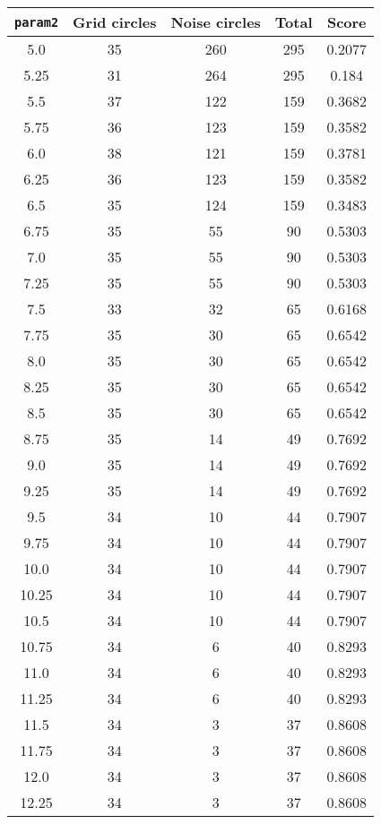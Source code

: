 \documentclass[letterpaper, 12pt]{article}
\begin{document}
\begin{longtable}{|c|c|c|c|c|}
\hline
\textbf{\texttt{param2}} & \textbf{Grid circles} & \textbf{Noise circles} & \textbf{Total} & \textbf{Score} \\
\hline
5.0 & 35 & 260 & 295 & 0.2077 \\
\hline
5.25 & 31 & 264 & 295 & 0.184 \\
\hline
5.5 & 37 & 122 & 159 & 0.3682 \\
\hline
5.75 & 36 & 123 & 159 & 0.3582 \\
\hline
6.0 & 38 & 121 & 159 & 0.3781 \\
\hline
6.25 & 36 & 123 & 159 & 0.3582 \\
\hline
6.5 & 35 & 124 & 159 & 0.3483 \\
\hline
6.75 & 35 & 55 & 90 & 0.5303 \\
\hline
7.0 & 35 & 55 & 90 & 0.5303 \\
\hline
7.25 & 35 & 55 & 90 & 0.5303 \\
\hline
7.5 & 33 & 32 & 65 & 0.6168 \\
\hline
7.75 & 35 & 30 & 65 & 0.6542 \\
\hline
8.0 & 35 & 30 & 65 & 0.6542 \\
\hline
8.25 & 35 & 30 & 65 & 0.6542 \\
\hline
8.5 & 35 & 30 & 65 & 0.6542 \\
\hline
8.75 & 35 & 14 & 49 & 0.7692 \\
\hline
9.0 & 35 & 14 & 49 & 0.7692 \\
\hline
9.25 & 35 & 14 & 49 & 0.7692 \\
\hline
9.5 & 34 & 10 & 44 & 0.7907 \\
\hline
9.75 & 34 & 10 & 44 & 0.7907 \\
\hline
10.0 & 34 & 10 & 44 & 0.7907 \\
\hline
10.25 & 34 & 10 & 44 & 0.7907 \\
\hline
10.5 & 34 & 10 & 44 & 0.7907 \\
\hline
10.75 & 34 & 6 & 40 & 0.8293 \\
\hline
11.0 & 34 & 6 & 40 & 0.8293 \\
\hline
11.25 & 34 & 6 & 40 & 0.8293 \\
\hline
11.5 & 34 & 3 & 37 & 0.8608 \\
\hline
11.75 & 34 & 3 & 37 & 0.8608 \\
\hline
12.0 & 34 & 3 & 37 & 0.8608 \\
\hline
12.25 & 34 & 3 & 37 & 0.8608 \\

\end{longtable}
\end{document}
